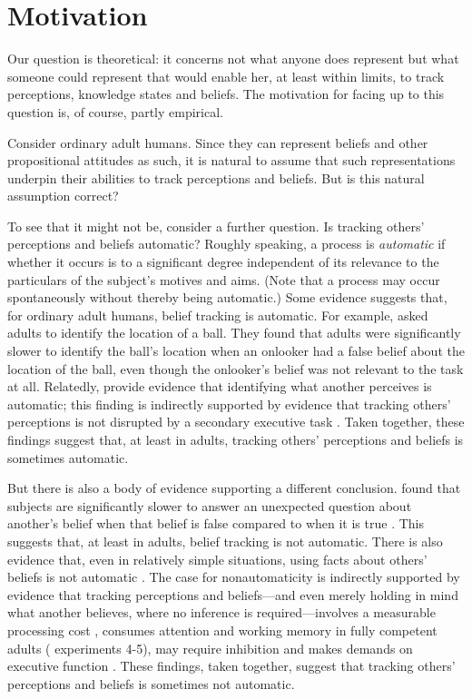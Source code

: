 \documentclass[12pt,\papersize]{extarticle}
\begin{document}
\section{Motivation}
\label{sec:motivation}
Our question is theoretical: it concerns 
not what anyone does represent
but what someone could represent that would enable her, at least within limits, to track perceptions, knowledge states and beliefs.
The motivation for facing up to this question is, of course, partly empirical.

Consider ordinary adult humans.
Since they can represent beliefs and other propositional attitudes as such, 
it is natural to assume that such representations underpin their abilities to track perceptions and beliefs.
But is this natural assumption correct?

To see that it might not be, consider a further question.
Is tracking others' perceptions and beliefs automatic?
Roughly speaking,
a process is \emph{automatic} if whether it occurs is to a significant degree independent of its relevance to the particulars of the subject's motives and aims.
(Note that a process may occur spontaneously without thereby being automatic.)  
Some evidence suggests that, for ordinary adult humans, belief tracking is automatic.
For example,
\citet{kovacs_social_2010} asked adults to identify the location of a ball.
They found that adults were significantly slower to identify the ball's location when an onlooker had a false belief about the location of the ball,
even though the onlooker's belief was not relevant to the task at all.
Relatedly, \citet{Samson:2010jm} provide evidence that identifying what another perceives is automatic;  this finding is indirectly supported by  evidence that tracking others' perceptions is not disrupted by a secondary executive task \citep{qureshi:2010_executive}.
Taken together, these findings suggest that, at least in adults, tracking others' perceptions and beliefs is sometimes automatic.

But there is also a body of evidence supporting a different conclusion.
\citet{back:2010_apperly} found that subjects are significantly slower to answer an unexpected question about another's belief when that belief is false compared to when it is true \citep[see also][]{apperly:2006_belief}.
This suggests that, at least in adults, belief tracking is not automatic.
There is also evidence that, even in relatively simple situations, 
using facts about others' beliefs is not automatic \citep{Keysar:2003xu,apperly:2010_limits}.
The case for nonautomaticity is indirectly supported by evidence that tracking perceptions and beliefs---and even merely holding in mind what another believes, where no inference is required---involves a measurable processing cost  \citep{apperly:2008_back,apperly:2010_limits}, consumes attention and working memory in fully competent adults (\citealp{en_1698, lin:2010_reflexively, en_1547} experiments 4-5), may require inhibition \citep{bull:2008_role} and makes demands on executive function \citep{apperly:2004_frontal,samson:2005_seeing}.
These findings, taken together, suggest that tracking others' perceptions and beliefs is sometimes not automatic.
\end{document}
